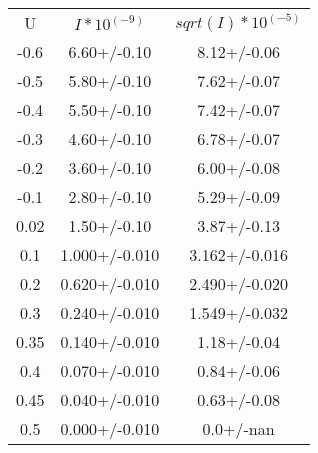 \begin{table}
\begin{tabular}{ccc}
U & $I*10^(-9)$ & $sqrt(I)*10^(-5)$ \\
-0.6 & 6.60+/-0.10 & 8.12+/-0.06 \\
-0.5 & 5.80+/-0.10 & 7.62+/-0.07 \\
-0.4 & 5.50+/-0.10 & 7.42+/-0.07 \\
-0.3 & 4.60+/-0.10 & 6.78+/-0.07 \\
-0.2 & 3.60+/-0.10 & 6.00+/-0.08 \\
-0.1 & 2.80+/-0.10 & 5.29+/-0.09 \\
0.02 & 1.50+/-0.10 & 3.87+/-0.13 \\
0.1 & 1.000+/-0.010 & 3.162+/-0.016 \\
0.2 & 0.620+/-0.010 & 2.490+/-0.020 \\
0.3 & 0.240+/-0.010 & 1.549+/-0.032 \\
0.35 & 0.140+/-0.010 & 1.18+/-0.04 \\
0.4 & 0.070+/-0.010 & 0.84+/-0.06 \\
0.45 & 0.040+/-0.010 & 0.63+/-0.08 \\
0.5 & 0.000+/-0.010 & 0.0+/-nan \\
\end{tabular}
\end{table}

